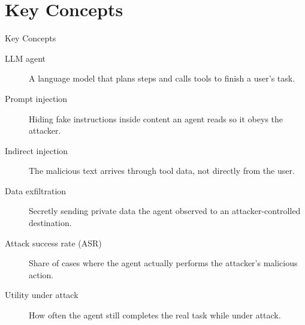 \documentclass[10pt]{beamer}
\begin{document}
\section{Key Concepts}
\begin{frame}[allowframebreaks]{Key Concepts}
  \begin{description}
    \item[LLM agent] A language model that plans steps and calls tools to finish a user's task.
    \item[Prompt injection] Hiding fake instructions inside content an agent reads so it obeys the attacker.
    \item[Indirect injection] The malicious text arrives through tool data, not directly from the user.
    \item[Data exfiltration] Secretly sending private data the agent observed to an attacker-controlled destination.
    \item[Attack success rate (ASR)] Share of cases where the agent actually performs the attacker's malicious action.
    \item[Utility under attack] How often the agent still completes the real task while under attack.
  \end{description}
\end{frame}
\end{document}
